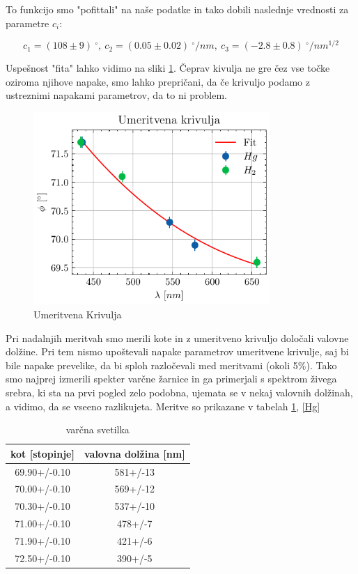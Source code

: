 \documentclass[12pt]{article}
\begin{document}
To funkcijo smo "pofittali" na naše podatke in tako dobili naslednje vrednosti za parametre $c_i$:

\begin{equation*}
    c_1 = (108\pm 9)\ ^{\circ},\ c_2 = (0.05 \pm 0.02)\ ^{\circ}/nm,\ c_3 = (-2.8 \pm 0.8)\ ^{\circ}/nm^{1/2}
\end{equation*}

\noindent Uspešnost "fita" lahko vidimo na sliki \ref{kalibracija}. Čeprav kivulja ne gre čez vse točke oziroma njihove napake, smo lahko prepričani, da če krivuljo podamo z ustreznimi napakami parametrov, da to ni problem.

\begin{figure}[ht]
\begin{center}
    \includegraphics[width=9cm]{kalibracija.pdf}
    \caption{Umeritvena Krivulja}
    \label{kalibracija}
\end{center}
\end{figure}
\newpage

Pri nadalnjih meritvah smo merili kote in z umeritveno krivuljo določali valovne dolžine. Pri tem nismo upoštevali napake parametrov umeritvene krivulje, saj bi bile napake prevelike, da bi sploh razločevali med meritvami (okoli 5\%). Tako smo najprej izmerili spekter varčne žarnice in ga primerjali s spektrom živega srebra, ki sta na prvi pogled zelo podobna, ujemata se v nekaj valovnih dolžinah, a vidimo, da se vseeno razlikujeta. Meritve so prikazane v tabelah \ref{varčna}, \ref{Hg}

\begin{table}[!ht]
\centering
\begin{tabular}{c|c}
    kot [stopinje]& valovna dolžina [nm] \\\hline
    69.90+/-0.10 & 581+/-13 \\
    70.00+/-0.10 & 569+/-12 \\
    70.30+/-0.10 & 537+/-10 \\
    71.00+/-0.10 & 478+/-7 \\
    71.90+/-0.10 & 421+/-6 \\
    72.50+/-0.10 & 390+/-5 \\
\end{tabular}
\caption{varčna svetilka}
\label{varčna}
\end{table}
\end{document}
